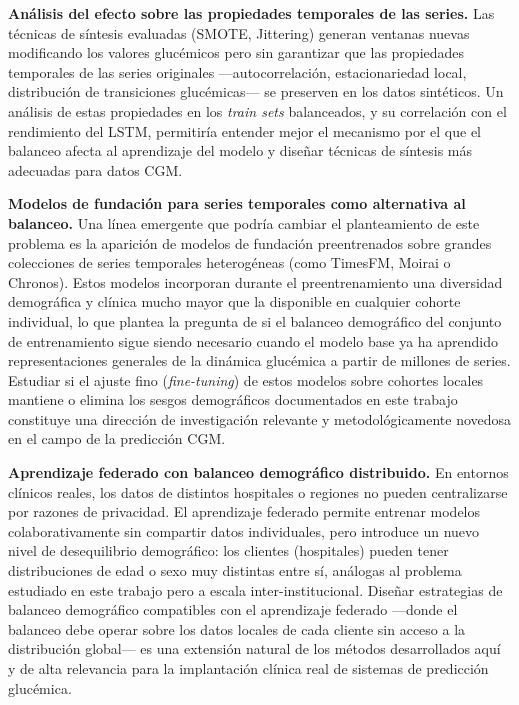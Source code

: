 \textbf{Análisis del efecto sobre las propiedades temporales de las
series.} Las técnicas de síntesis evaluadas (SMOTE, Jittering) generan
ventanas nuevas modificando los valores glucémicos pero sin garantizar
que las propiedades temporales de las series originales ---autocorrelación,
estacionariedad local, distribución de transiciones glucémicas--- se
preserven en los datos sintéticos. Un análisis de estas propiedades en
los \textit{train sets} balanceados, y su correlación con el rendimiento
del LSTM, permitiría entender mejor el mecanismo por el que el balanceo
afecta al aprendizaje del modelo y diseñar técnicas de síntesis más
adecuadas para datos CGM.

\textbf{Modelos de fundación para series temporales como alternativa al
balanceo.} Una línea emergente que podría cambiar el planteamiento de
este problema es la aparición de modelos de fundación preentrenados
sobre grandes colecciones de series temporales heterogéneas (como
TimesFM, Moirai o Chronos). Estos modelos incorporan durante el
preentrenamiento una diversidad demográfica y clínica mucho mayor que
la disponible en cualquier cohorte individual, lo que plantea la pregunta
de si el balanceo demográfico del conjunto de entrenamiento sigue siendo
necesario cuando el modelo base ya ha aprendido representaciones generales
de la dinámica glucémica a partir de millones de series. Estudiar si el
ajuste fino (\textit{fine-tuning}) de estos modelos sobre cohortes
locales mantiene o elimina los sesgos demográficos documentados en este
trabajo constituye una dirección de investigación relevante y
metodológicamente novedosa en el campo de la predicción CGM.

\textbf{Aprendizaje federado con balanceo demográfico distribuido.}
En entornos clínicos reales, los datos de distintos hospitales o regiones
no pueden centralizarse por razones de privacidad. El aprendizaje
federado permite entrenar modelos colaborativamente sin compartir datos
individuales, pero introduce un nuevo nivel de desequilibrio demográfico:
los clientes (hospitales) pueden tener distribuciones de edad o sexo
muy distintas entre sí, análogas al problema estudiado en este trabajo
pero a escala inter-institucional. Diseñar estrategias de balanceo
demográfico compatibles con el aprendizaje federado ---donde el balanceo
debe operar sobre los datos locales de cada cliente sin acceso a la
distribución global--- es una extensión natural de los métodos
desarrollados aquí y de alta relevancia para la implantación clínica
real de sistemas de predicción glucémica.

